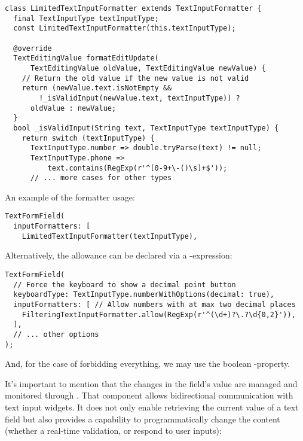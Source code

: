 \begin{lstlisting}
class LimitedTextInputFormatter extends TextInputFormatter {
  final TextInputType textInputType;
  const LimitedTextInputFormatter(this.textInputType);

  @override
  TextEditingValue formatEditUpdate(
      TextEditingValue oldValue, TextEditingValue newValue) {
    // Return the old value if the new value is not valid
    return (newValue.text.isNotEmpty &&
        !_isValidInput(newValue.text, textInputType)) ?
      oldValue : newValue;
  }
  bool _isValidInput(String text, TextInputType textInputType) {
    return switch (textInputType) {
      TextInputType.number => double.tryParse(text) != null;
      TextInputType.phone => 
          text.contains(RegExp(r'^[0-9+\-()\s]+$'));
      // ... more cases for other types
\end{lstlisting}

\noindent An example of the formatter usage:

\begin{lstlisting}
TextFormField(
  inputFormatters: [
    LimitedTextInputFormatter(textInputType),
\end{lstlisting}

\noindent Alternatively, the allowance can be declared via a -expression:

\begin{lstlisting}
TextFormField(
  // Force the keyboard to show a decimal point button
  keyboardType: TextInputType.numberWithOptions(decimal: true),
  inputFormatters: [ // Allow numbers with at max two decimal places
    FilteringTextInputFormatter.allow(RegExp(r'^(\d+)?\.?\d{0,2}')),
  ],
  // ... other options
);
\end{lstlisting}

\noindent And, for the case of forbidding everything, we may use the boolean -property. 

It's important to mention that the changes in the field's value are managed and monitored through . 
That component allows bidirectional communication with text input widgets. It does not only enable retrieving the 
current value of a text field but also provides a capability to programmatically change the content (whether a real-time 
validation, or respond to user inputs):

